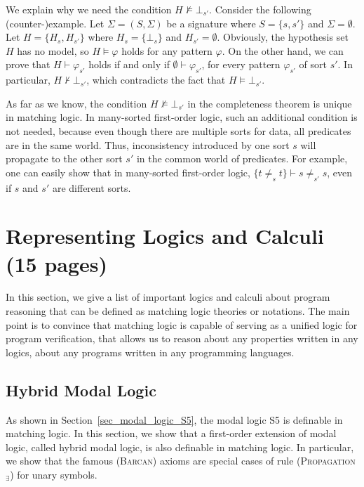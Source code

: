 \documentclass[acmsmall,review,anonymous]{acmart}
\newcommand{\sig}{\mathbb{\Sigma}}
\newcommand{\prule}[1]{\textsc{(#1)}}
\newcommand{\propagationexists}{\prule{Propagation$_\exists$}\xspace}
\begin{document}
We explain why we need the condition
$H \not\vDash \bot_{s'}$.
Consider the following (counter-)example.
Let $\sig = (S,\Sigma)$ be a signature
where $S = \{s,s'\}$ and $\Sigma = \emptyset$.
Let $H = \{ H_s , H_{s'} \}$ where
$H_s = \{ \bot_s \}$ and $H_{s'} = \emptyset$.
Obviously, the hypothesis set $H$ has no model,
so $H \vDash \varphi$ holds for any pattern $\varphi$.
On the other hand,
we can prove that
$H \vdash \varphi_{s'}$ holds if and only if
$\emptyset \vdash \varphi_{s'}$,
for every pattern $\varphi_{s'}$ of sort $s'$.
In particular, $H \not\vdash \bot_{s'}$,
which contradicts the fact that
$H \vDash \bot_{s'}$.

As far as we know, the condition $H \not\vDash \bot_{s'}$
in the completeness theorem is unique in matching logic.
In many-sorted first-order logic,
such an additional condition is not needed, because even though
there are multiple sorts for data, all predicates are in the same world.
Thus, inconsistency introduced by one sort $s$ will propagate to the other sort $s'$
in the common world of predicates.
For example, one can easily show that in many-sorted first-order logic,
$\{ t \neq_s t \} \vdash s \neq_{s'} s$,
even if $s$ and $s'$ are different sorts.



\section{Representing Logics and Calculi (15 pages)}

In this section, we give a list of important logics and calculi about
program reasoning that can be defined as matching logic theories or notations.
The main point is to convince that matching logic is capable of
serving as a unified logic for program verification,
that allows us to reason about any properties written in any logics,
about any programs written in any programming languages.

\subsection{Hybrid Modal Logic}
\label{sec_hybrid_modal_logic}

As shown in Section~\ref{sec_modal_logic_S5},
the modal logic S5 is definable in matching logic.
In this section, we show that
a first-order extension of modal logic, called hybrid modal logic,
is also definable in matching logic.
In particular, we show that the famous \prule{Barcan} axioms are special cases
of rule \propagationexists for unary symbols.
\end{document}
